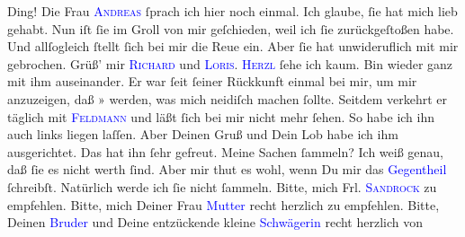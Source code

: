                Ding!\pend
           \pstart
           Die Frau \textsc{\textcolor{blue}{Andreas}{}\ledrightnote{\textcolor{blue}{Lou Andreas-Salomé}}} ſprach ich hier noch einmal. Ich glaube, ſie hat mich lieb gehabt. Nun iſt ſie
               im Groll von mir geſchieden, weil ich ſie zurückgeſtoßen habe. Und allſogleich ſtellt
                  {\pb}ſich bei mir die Reue ein. Aber ſie hat
               unwideruflich mit mir gebrochen.\pend
           \pstart
           Grüß’ mir \textsc{\textcolor{blue}{Richard}{}\ledrightnote{\textcolor{blue}{Richard Beer-Hofmann}}} und \textsc{\textcolor{blue}{Loris}{}\ledrightnote{\textcolor{blue}{Hugo von Hofmannsthal}}}.\pend
           \pstart
           \textsc{\textcolor{blue}{Herzl}{}\ledrightnote{\textcolor{blue}{Theodor Herzl}}} ſehe ich kaum. Bin wieder ganz mit ihm auseinander. Er war ſeit ſeiner
               Rückkunft einmal bei mir, um mir anzuzeigen, daß »\label{K_L02616-665v}\label{K_L02616-665h} werden, was mich neidiſch machen ſollte. Seitdem verkehrt er
               täglich mit \textsc{\textcolor{blue}{Feldmann}{}\ledrightnote{\textcolor{blue}{Siegmund Feldmann}}} und läßt ſich bei mir nicht mehr ſehen. So habe ich ihn auch links liegen
               laſſen.\pend
           \pstart
           Aber Deinen Gruß und {\pb}Dein Lob habe ich ihm ausgerichtet. Das hat ihn ſehr gefreut.\pend
           \pstart
           Meine Sachen ſammeln? Ich weiß genau, daß ſie es nicht werth ſind. Aber mir thut es
               wohl, wenn Du mir das \textcolor{blue}{Gegentheil}{}\ledrightnote{\textcolor{blue}{Gustav Mahler}} ſchreibſt. Natürlich werde ich ſie nicht
               ſammeln.\pend
           \pstart
           Bitte, mich Frl. \textsc{\textcolor{blue}{Sandrock}{}\ledrightnote{\textcolor{blue}{Adele Sandrock}}} zu empfehlen.\pend
           \pstart
           Bitte, mich Deiner Frau \textcolor{blue}{Mutter}{} recht herzlich zu empfehlen. Bitte, Deinen \textcolor{blue}{Bruder}{} und Deine entzückende kleine \textcolor{blue}{Schwägerin}{} recht herzlich von
